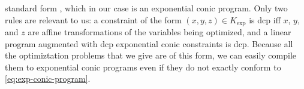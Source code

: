 standard form \parencite{agrawal2018rewriting}, 
which in our case is
 an exponential conic program.
Only two rules are relevant to us: a constraint of the form
$(x,y,z) \in K_{\exp}$ is dcp iff $x$, $y$, and $z$ are affine transformations of the variables being optimized, 
and a linear program
augmented
with dcp exponential conic constraints is dcp.
Because all the optimiztation problems that we give are
of this form,
we can easily compile them
to exponential conic programs even if they do not exactly conform to \eqref{eq:exp-conic-program}.


%



